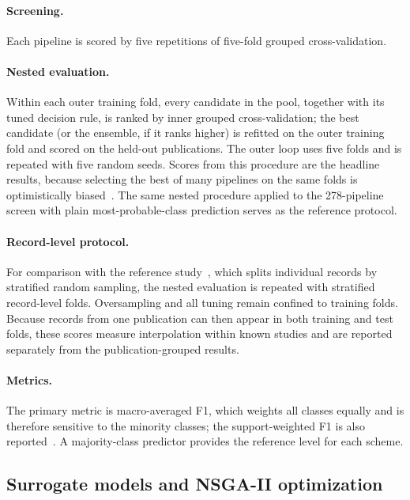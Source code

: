 \documentclass[10pt,a4paper]{article}
\begin{document}
\paragraph{Screening.} Each pipeline is scored by five repetitions of
five-fold grouped cross-validation.

\paragraph{Nested evaluation.} Within each outer training fold, every candidate
in the pool, together with its tuned decision rule, is ranked by inner grouped
cross-validation; the best candidate (or the ensemble, if it ranks higher) is
refitted on the outer training fold and scored on the held-out publications.
The outer loop uses five folds and is repeated with five random seeds. Scores
from this procedure are the headline results, because selecting the best of
many pipelines on the same folds is optimistically
biased~\cite{varma2006bias,cawley2010overfitting}. The same nested procedure
applied to the 278-pipeline screen with plain most-probable-class prediction
serves as the reference protocol.

\paragraph{Record-level protocol.} For comparison with the reference
study~\cite{li2025hmf}, which splits individual records by stratified random
sampling, the nested evaluation is repeated with stratified record-level
folds. Oversampling and all tuning remain confined to training folds. Because
records from one publication can then appear in both training and test folds,
these scores measure interpolation within known studies and are reported
separately from the publication-grouped results.

\paragraph{Metrics.} The primary metric is macro-averaged F1, which weights all
classes equally and is therefore sensitive to the minority classes; the
support-weighted F1 is also reported~\cite{sokolova2009systematic}. A
majority-class predictor provides the reference level for each scheme.

\subsection{Surrogate models and NSGA-II optimization}
\label{sec:nsga}
\end{document}
